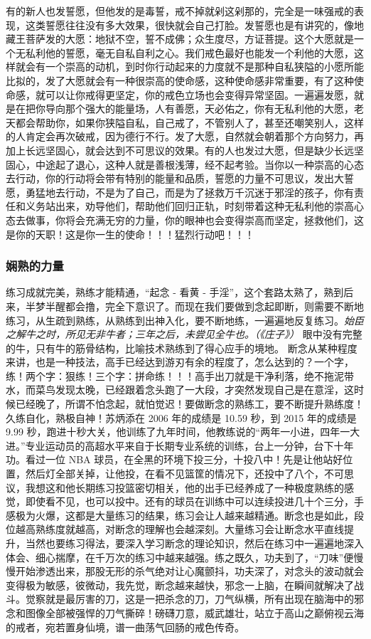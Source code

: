 有的新人也发誓愿，但他发的是毒誓，戒不掉就剁这剁那的，完全是一味强戒的表现，这类誓愿往往没有多大效果，很快就会自己打脸。发誓愿也是有讲究的，像地藏王菩萨发的大愿：地狱不空，誓不成佛；众生度尽，方证菩提。这个大愿就是一个无私利他的誓愿，毫无自私自利之心。我们戒色最好也能发一个利他的大愿，这样就会有一个崇高的动机，到时你行动起来的力度就不是那种自私狭隘的小愿所能比拟的，发了大愿就会有一种很崇高的使命感，这种使命感非常重要，有了这种使命感，就可以让你戒得更坚定，你的戒色立场也会变得异常坚固。一遍遍发愿，就是在把你导向那个强大的能量场，人有善愿，天必佑之，你有无私利他的大愿，老天都会帮助你，如果你狭隘自私，自己戒了，不管别人了，甚至还嘲笑别人，这样的人肯定会再次破戒，因为德行不行。发了大愿，自然就会朝着那个方向努力，再加上长远坚固心，就会达到不可思议的效果。有的人也发过大愿，但是缺少长远坚固心，中途起了退心，这种人就是善根浅薄，经不起考验。当你以一种崇高的心态去行动，你的行动将会带有特别的能量和品质，誓愿的力量不可思议，发出大誓愿，勇猛地去行动，不是为了自己，而是为了拯救万千沉迷于邪淫的孩子，你有责任和义务站出来，劝导他们，帮助他们回归正轨，时刻带着这种无私利他的崇高心态去做事，你将会充满无穷的力量，你的眼神也会变得崇高而坚定，拯救他们，这是你的天职！这是你一生的使命！！！猛烈行动吧！！！

\subsubsection{娴熟的力量}

练习成就完美，熟练才能精通，“起念 - 看黄 - 手淫”，这个套路太熟了，熟到后来，半梦半醒都会撸，完全下意识了。而现在我们要做到念起即断，则需要不断地练习，从生疏到熟练，从熟练到出神入化，要不断地练，一遍遍地反复练习。\textit{始臣之解牛之时，所见无非牛者；三年之后，未尝见全牛也。（《庄子》）} 眼中没有完整的牛，只有牛的筋骨结构，比喻技术熟练到了得心应手的境地。 断念从某种程度来讲，也是一种技法，高手已经达到游刃有余的程度了，怎么达到的？一个字，练！两个字：狠练！三个字：拼命练！！！高手出刀就是干净利落，绝不拖泥带水，而菜鸟发现太晚，已经跟着念头跑了一大段，才突然发现自己是在意淫，这时候已经晚了，所谓不怕念起，就怕觉迟！要做断念的熟练工，要不断提升熟练度！久练自化，熟极自神！苏炳添在 2006 年的成绩是 10.59 秒，到 2015 年的成绩是 9.99 秒，跑进十秒大关，他训练了九年时间，他教练说的“两年一小进，四年一大进。”专业运动员的高超水平来自于长期专业系统的训练，台上一分钟，台下十年功。看过一位 NBA 球员，在全黑的环境下投三分，十投八中！先是让他站好位置，然后灯全部关掉，让他投，在看不见篮筐的情况下，还投中了八个，不可思议，我想这和他长期练习投篮密切相关，他的出手已经养成了一种极度熟练的感觉，即使看不见，也可以投中。还有的球员在训练中可以连续投进几十个三分，手感极为火爆，这都是大量练习的结果，练习会让人越来越精通。断念也是如此，段位越高熟练度就越高，对断念的理解也会越深刻。大量练习会让断念水平直线提升，当然也要练习得法，要深入学习断念的理论知识，然后在练习中一遍遍地深入体会、细心揣摩，在千万次的练习中越来越强。练之既久，功夫到了，“刀味”便慢慢开始渗透出来，那股无形的杀气绝对让心魔颤抖，功夫深了，对念头的波动就会变得极为敏感，彼微动，我先觉，断念越来越快，邪念一上脑，在瞬间就解决了战斗。觉察就是最厉害的刀，这是一把杀念的刀，刀气纵横，所有出现在脑海中的邪念和图像全部被强悍的刀气撕碎！磅礴刀意，威武雄壮，站立于高山之巅俯视云海的戒者，宛若置身仙境，谱一曲荡气回肠的戒色传奇。

